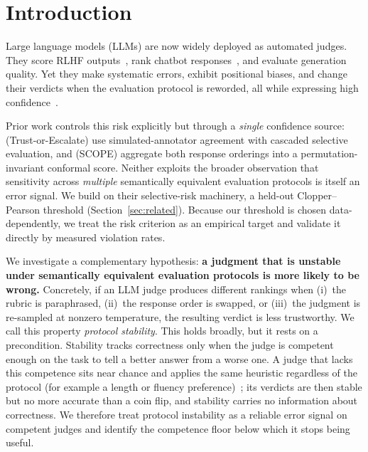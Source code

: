 
\section{Introduction}
\label{sec:intro}

Large language models (LLMs) are now widely deployed as automated judges. They score RLHF outputs~\citep{ouyang2022training}, rank chatbot responses~\citep{zheng2023judging}, and evaluate generation quality. Yet they make systematic errors, exhibit positional biases, and change their verdicts when the evaluation protocol is reworded, all while expressing high confidence~\citep{li2024llmsasjudges,wang2023faireval,wei2024systematic}.

Prior work controls this risk explicitly but through a \emph{single} confidence source: \citet{jung2025trust} (Trust-or-Escalate) use simulated-annotator agreement with cascaded selective evaluation, and \citet{badshah2026scope} (SCOPE) aggregate both response orderings into a permutation-invariant conformal score. Neither exploits the broader observation that sensitivity across \emph{multiple} semantically equivalent evaluation protocols is itself an error signal. We build on their selective-risk machinery, a held-out Clopper--Pearson threshold (Section~\ref{sec:related}). Because our threshold is chosen data-dependently, we treat the risk criterion as an empirical target and validate it directly by measured violation rates.

We investigate a complementary hypothesis: \textbf{a judgment that is unstable under semantically equivalent evaluation protocols is more likely to be wrong.}
Concretely, if an LLM judge produces different rankings when (i)~the rubric is paraphrased, (ii)~the response order is swapped, or (iii)~the judgment is re-sampled at nonzero temperature, the resulting verdict is less trustworthy. We call this property \emph{protocol stability}.
This holds broadly, but it rests on a precondition. Stability tracks correctness only when the judge is competent enough on the task to tell a better answer from a worse one. A judge that lacks this competence sits near chance and applies the same heuristic regardless of the protocol (for example a length or fluency preference)~\citep{xu2026inside}; its verdicts are then stable but no more accurate than a coin flip, and stability carries no information about correctness. We therefore treat protocol instability as a reliable error signal on competent judges and identify the competence floor below which it stops being useful.

